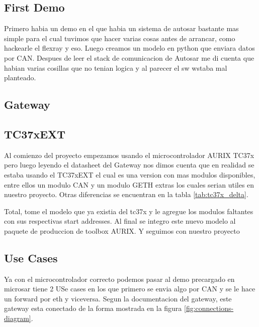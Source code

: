 \subsection{First Demo}
Primero habia un demo en el que habia un sistema de autosar bastante mas simple para el cual tuvimos que hacer varias cosas antes de arrancar, como hackearle el flexray y eso. Luego creamos un modelo en python que enviara datos por CAN. Despues de leer el stack de comunicacion de Autosar me di cuenta que habian varias cosillas que no tenian logica y al parecer el sw wstaba mal planteado. 
\subsection{Gateway}

\subsection{TC37xEXT}
Al comienzo del proyecto empezamos usando el microcontrolador AURIX TC37x \cite{aurix.tc37x} pero luego leyendo el datasheet del Gateway nos dimos cuenta que en realidad se estaba usando el TC37xEXT \cite{aurix.tc37e} el cual es una version con mas modulos disponibles, entre ellos un modulo CAN y un modulo GETH extras los cuales serian utiles en nuestro proyecto. Otras diferencias se encuentran en la tabla \ref{tab:tc37x_delta}.



Total, tome el modelo que ya existia del tc37x y le agregue los modulos faltantes con sus respectivas start addresses. Al final se integro este nuevo modelo al paquete de produccion de toolbox AURIX. Y seguimos con nuestro proyecto

\subsection{Use Cases}
Ya con el microcontrolador correcto podemos pasar al demo precargado en microsar tiene 2 USe cases en los que primero se envia algo por CAN y se le hace un forward por eth y viceversa.
Segun la documentacion del gateway, este gateway esta conectado de la forma mostrada en la figura \ref{fig:connections-diagram}. 

